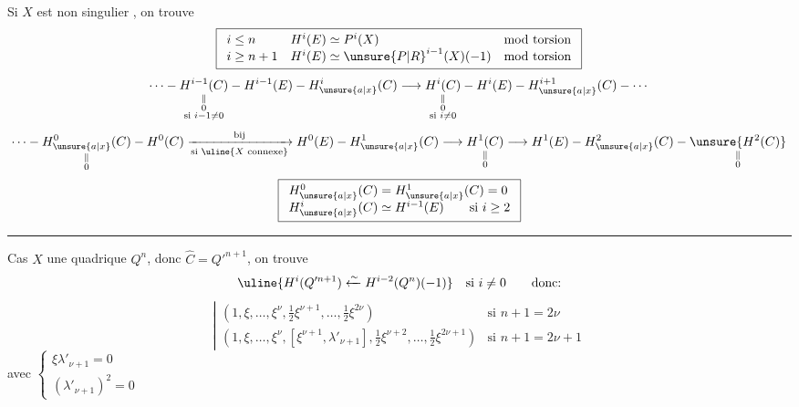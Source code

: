 Si $X$ est non singulier , on trouve
\[
\boxed{\begin{array}{lll}
i\le n&H^i(E)\simeq P^i(X)&\text{mod torsion}\\
i\ge n+1&H^i(E)\simeq\unsure{P|R}^{i-1}(X)(-1)&\text{mod torsion}
\end{array}}
\]
\[
\cdots\mathbin{-}
\underset{\substack{\Vert\\0\\\text{si }i-1\ne0}}{H^{i-1}(C)}
\mathbin{-}H^{i-1}(E)\mathbin{-}H^i_{\unsure{a|x}}(C)
\longrightarrow
\underset{\substack{\Vert\\0\\\text{si }i\ne0}}{H^i(C)}
\mathbin{-}H^i(E)\mathbin{-}H^{i+1}_{\unsure{a|x}}(C)\mathbin{-}\cdots
\]
\[
\cdots\mathbin{-}\underset{\substack{\Vert\\0}}{H^0_{\unsure{a|x}}(C)}
\mathbin{-}H^0(C)
\xrightarrow[\text{si }\uline{X\text{ connexe}}]{\text{bij}}
H^0(E)\mathbin{-}H^1_{\unsure{a|x}}(C)
\longrightarrow\underset{\substack{\Vert\\0}}{H^1(C)}
\longrightarrow H^1(E)\mathbin{-}H^2_{\unsure{a|x}}(C)
\mathbin{-}\underset{\substack{\Vert\\0}}{\unsure{H^2(C)}}
\]
\[
\boxed{\begin{array}{l}
H^0_{\unsure{a|x}}(C)=H^1_{\unsure{a|x}}(C)=0\\
H^i_{\unsure{a|x}}(C)\simeq H^{i-1}(E)\qquad\text{si }i\ge2
\end{array}}
\]
\hrule
Cas $X$ une quadrique $Q^n$, donc $\hat C=Q'^{n+1}$, on trouve
\[
\uline{H^i(Q'^{n+1})\xleftarrow{\sim}H^{i-2}(Q^n)(-1)}
\quad\text{si }i\ne0\qquad\text{donc:}
\]
\[
\left|\begin{array}{ll}
\left(1,\xi,\ldots,\xi^\nu,\frac12\xi^{\nu+1},\ldots,\frac12\xi^{2\nu}\right)
&\text{si }\boxed{n+1=2\nu}\\[6pt]
\left(1,\xi,\ldots,\xi^\nu,[\xi^{\nu+1},\lambda'_{\nu+1}],
\frac12\xi^{\nu+2},\ldots,\frac12\xi^{2\nu+1}\right)
&\text{si }\boxed{n+1=2\nu+1}
\end{array}\right.
\]
avec $\left\{\begin{array}{l}\xi\lambda'_{\nu+1}=0\\(\lambda'_{\nu+1})^2=0\end{array}\right.$
